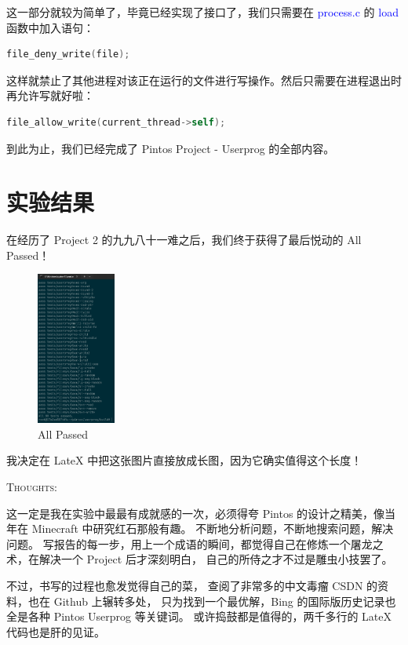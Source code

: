 \documentclass[14pt,a4paper,UTF8,twoside]{article}
\renewenvironment{proof}[1][Thoughts:]{\ProofBox\strut\textsc{#1}\space}{\endProofBox}
\renewcommand{\texttt}[1]{\textcolor{blue}{\ttfamily #1}}
\begin{document}
这一部分就较为简单了，毕竟已经实现了接口了，我们只需要在 \texttt{process.c} 的 \texttt{load} 函数中加入语句：

\begin{lstlisting}[language=C]
    file_deny_write(file);
\end{lstlisting}

这样就禁止了其他进程对该正在运行的文件进行写操作。然后只需要在进程退出时再允许写就好啦：

\begin{lstlisting}[language=C, title = exit\_process()]
    file_allow_write(current_thread->self);
\end{lstlisting}

到此为止，我们已经完成了 Pintos Project - Userprog 的全部内容。

\section{实验结果}

在经历了 Project 2 的九九八十一难之后，我们终于获得了最后悦动的 All Passed！

\begin{figure}[H]
    \centering
    \includegraphics[width=0.23\textwidth]{img6/allpass.png}
    \caption{All Passed}
    \label{fig:all_passed}
\end{figure}

我决定在 LateX 中把这张图片直接放成长图，因为它确实值得这个长度！

\vspace{0.4cm}

\begin{proof}

这一定是我在实验中最最有成就感的一次，必须得夸 Pintos 的设计之精美，像当年在 Minecraft 中研究红石那般有趣。
不断地分析问题，不断地搜索问题，解决问题。
写报告的每一步，用上一个成语的瞬间，都觉得自己在修炼一个屠龙之术，在解决一个 Project 后才深刻明白，
自己的所侍之才不过是雕虫小技罢了。

\vspace{0.5cm}

不过，书写的过程也愈发觉得自己的菜，
查阅了非常多的中文毒瘤 CSDN 的资料，也在 Github 上辗转多处，
只为找到一个最优解，Bing 的国际版历史记录也全是各种 Pintos Userprog 等关键词。
或许捣鼓都是值得的，两千多行的 LateX 代码也是肝的见证。
\end{proof}
\end{document}
